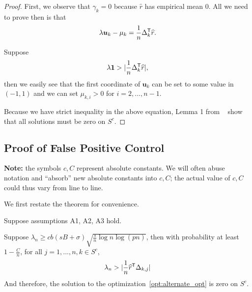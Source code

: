 \begin{proof}
First, we observe that $\gamma_k = 0$ because $\hat{r}$ has empirical mean 0. All we need to prove then is that 
\[
\lambda \mbox{\boldmath $u$}_k - \mu_k = \frac{1}{n} \Delta_k^{\mathsf{T}} \widehat{r}.
\]

Suppose
\[
\lambda \mbox{\boldmath $1$} > |\frac{1}{n} \Delta_k^{\mathsf{T}}\widehat{r}|,
\]
then we easily see that the first coordinate of $\mathbf{u}_k$ can be set to some value in $(-1,1)$ and we can set $\mu_{k,i} > 0$ for $i=2,...,n-1$. 

Because we have strict inequality in the above equation, Lemma 1 from ~\cite{Wain:09a} show that all solutions must be zero on $S^c$.
\end{proof}
 
 
 
 
 
 
 \subsection{Proof of False Positive Control}
 \label{sec:false_positive_proof}
 
\textbf{Note:} the symbols $c,C$ represent absolute constants. We will often abuse notation and ``absorb'' new absolute constants into $c, C$; the actual value of $c, C$ could thus vary from line to line.

 We first restate the theorem for convenience. 
 
\begin{theorem} 
Suppose assumptions A1, A2, A3 hold. 

Suppose $\lambda_n \geq c b (sB + \sigma) \sqrt{ \frac{s}{n} \log n \log (pn)}$, then with probability at least $ 1 - \frac{C}{n}$, for all $j=1,...,n,k \in S^c$,
\[
\lambda_n >  | \frac{1}{n} \widehat{r}^{\mathsf{T}} \Delta_{k,j}|
\]
And therefore, the solution to the optimization~\ref{opt:alternate_opt} is zero on $S^c$.
\end{theorem}

